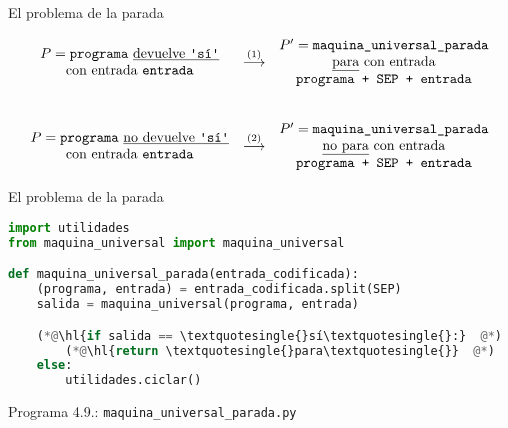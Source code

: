 \documentclass[10pt,xcolor=dvipsnames,aspectratio=169,spanish]{beamer}
\makeatletter
\let\HL\hl
\renewcommand\hl{%
  \let\set@color\beamerorig@set@color
  \let\reset@color\beamerorig@reset@color
  \HL}
\newcommand{\palabra}[1]{\texttt{\textquotesingle{}{#1}\textquotesingle{}}}
\makeatother
\begin{document}
\begin{frame}[label=maquina-universal-parada]{El problema de la parada}

$$\begin{matrix}
\begin{matrix}P = \texttt{programa}\text{ }\text{\underline{devuelve \palabra{sí}}}\\\text{con entrada }\texttt{entrada}\end{matrix}
& \stackrel{(1)}{\longrightarrow} &
\begin{matrix}P' = \texttt{maquina\_universal\_parada}\\\text{\underline{para} con entrada}\\ \texttt{programa + SEP + entrada}\end{matrix} \\
\\
\\
\begin{matrix}P = \texttt{programa}\text{ }\text{\underline{no devuelve \palabra{sí}}}\\\text{con entrada }\texttt{entrada}\end{matrix}
& \stackrel{(2)}{\longrightarrow} &
\begin{matrix}P' = \texttt{maquina\_universal\_parada}\\\text{\underline{no para} con entrada}\\ \texttt{programa + SEP + entrada}\end{matrix}
\end{matrix}$$

\end{frame}



\begin{frame}[fragile]{El problema de la parada}

\begin{lstlisting}[language=Python]
import utilidades
from maquina_universal import maquina_universal

def maquina_universal_parada(entrada_codificada):
    (programa, entrada) = entrada_codificada.split(SEP)
    salida = maquina_universal(programa, entrada)

    (*@\hl{if salida == \textquotesingle{}sí\textquotesingle{}:}  @*)
        (*@\hl{return \textquotesingle{}para\textquotesingle{}}  @*)
    else:
        utilidades.ciclar()
\end{lstlisting}
\vspace*{-4mm}
\begin{center}
{\small Programa 4.9.: \texttt{maquina\_universal\_parada.py}}
\end{center}

\end{frame}
\end{document}
